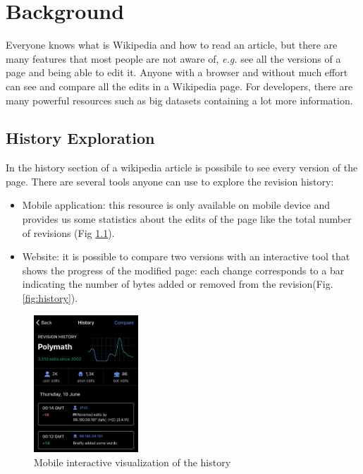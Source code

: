 \chapter{Background}
Everyone knows what is Wikipedia and how to read an article, but there are many features
that most people are not aware of, \textit{e.g.} see all the versions of a page and being able to edit it. 
Anyone with a browser and without much effort can see and compare all the edits in a
Wikipedia page. For developers, there are many powerful resources such as big datasets
containing a lot more information.  

\section{History Exploration}
In the history section of a wikipedia article is possibile to see every version of the page.
There are several tools anyone can use to explore the revision history: 


\begin{itemize}
    \item Mobile application: this resource is only available on mobile device and provides us
        some statistics about the edits of the page like the total number of revisions (Fig \ref{fig:mobilehistory}). 
    \item Website: it is possible to compare two versions with an interactive tool that shows
        the progress of the modified page: each change corresponds to a bar indicating the number of
        bytes added or removed from the revision(Fig. \ref{fig:history}).
\end{itemize}

\begin{figure}[H]
    \centering
    \includegraphics[width=0.35\textwidth]{./chapters/02/assets/mobile_history.jpg}
    \caption{Mobile interactive visualization of the history}
    \label{fig:mobilehistory}
\end{figure}

